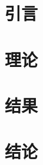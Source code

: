 \documentclass[aps,pra,preprint,groupedaddress]{revtex4-2}
\begin{document}
\title{}

\author{}
\affiliation{}

\date{\today}

\begin{abstract}
\end{abstract}

\maketitle

\section{引言}

\section{理论}

\section{结果}

\section{结论}






\end{document}
